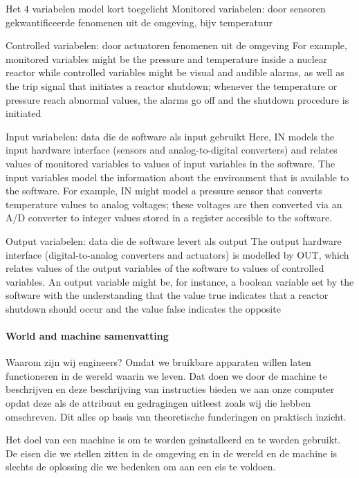 Het 4 variabelen model kort toegelicht
Monitored variabelen: door sensoren gekwantificeerde fenomenen uit de omgeving, bijv temperatuur

Controlled variabelen: door actuatoren \bestuurde fenomenen uit de omgeving
For example, monitored variables might be the pressure and temperature
inside a nuclear reactor while controlled variables might be visual and audible alarms, as well
as the trip signal that initiates a reactor shutdown; whenever the temperature or pressure reach
abnormal values, the alarms go off and the shutdown procedure is initiated

Input variabelen: data die de software als input gebruikt
Here, IN models the input hardware interface (sensors and analog-to-digital converters) and
relates values of monitored variables to values of input variables in the software. The input variables model the information about the environment that is available to the software. For example,
IN might model a pressure sensor that converts temperature values to analog voltages; these voltages are then converted via an A/D converter to integer values stored in a register accesible to the
software.

Output variabelen: data die de software levert als output
The output hardware interface (digital-to-analog converters and actuators) is modelled
by OUT, which relates values of the output variables of the software to values of controlled variables. An output variable might be, for instance, a boolean variable set by the software with the
understanding that the value true indicates that a reactor shutdown should occur and the value
false indicates the opposite




\paragraph{World and machine samenvatting}
Waarom zijn wij engineers? Omdat we bruikbare apparaten willen laten functioneren in de wereld waarin we leven. Dat doen we door de machine te beschrijven en deze beschrijving van instructies bieden we aan onze computer opdat deze als de attribuut en gedragingen uitleest zoals wij die hebben omschreven. Dit alles op basis van theoretische funderingen en praktisch inzicht. 

Het doel van een machine is om te worden geinstalleerd en te worden gebruikt. De eisen die we stellen zitten in de omgeving en in de wereld en de machine is slechts de oplossing die we bedenken om aan een eis te voldoen. 

